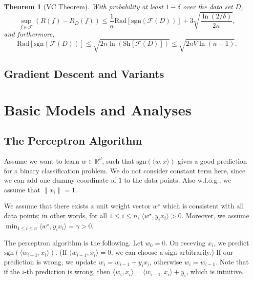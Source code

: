 \documentclass[openany]{book}
\newtheorem{theorem}{Theorem}[chapter]
\theoremstyle{definition}
\theoremstyle{remark}
\begin{document}
\begin{theorem}[VC Theorem]
    With probability at least $1-\delta$ over the data set $D$,
    \begin{equation*}
        \sup_{f\in \mathcal{F}}\left(R(f)-R_{D}(f)\right)\le \frac{1}{n}\mathrm{Rad}[\mathrm{sgn}(\mathcal{F}(D))]+3\sqrt{\frac{\ln(2/\delta)}{2n}},
    \end{equation*}
    and furthermore,
    \begin{equation*}
        \mathrm{Rad}[\mathrm{sgn}(\mathcal{F}(D))]\le\sqrt{2n\ln\left(\mathrm{Sh}[\mathcal{F}(D)]\right)}\le\sqrt{2nV\ln(n+1)}.
    \end{equation*}
\end{theorem}

\chapter{Gradient Descent and Variants}


\part{Basic Models and Analyses}
\chapter{The Perceptron Algorithm}
Assume we want to learn $w\in \mathbb{R}^d$, such that $\mathrm{sgn}(\langle w,x\rangle)$ gives a good prediction for a binary classification problem. We do not consider constant term here, since we can add one dummy coordinate of $1$ to the data points. Also w.l.o.g., we assume that $\|x_i\|=1$.

We assume that there exists a unit weight vector $w^{\star}$ which is consistent with all data points; in other words, for all $1\le i\le n$, $\langle w^{\star},y_ix_i\rangle>0$. Moreover, we assume $\min_{1\le i\le n}\langle w^{\star},y_ix_i\rangle=\gamma>0$.

The perceptron algorithm is the following. Let $w_0=0$. On receving $x_i$, we predict $\mathrm{sgn}(\langle w_{i-1},x_i\rangle)$. (If $\langle w_{i-1},x_i\rangle=0$, we can choose a sign arbitrarily.) If our prediction is wrong, we update $w_i=w_{i-1}+y_ix_i$, otherwise $w_i=w_{i-1}$. Note that if the $i$-th prediction is wrong, then $\langle w_i,x_i\rangle=\langle w_{i-1},x_i\rangle+y_i$, which is intuitive.
\end{document}
